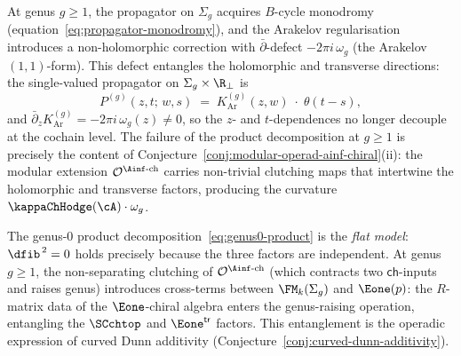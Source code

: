\begin{remark}
\label{rem:product-failure-higher-genus}
At genus $g \ge 1$, the propagator on $\Sigma_g$ acquires
$B$-cycle monodromy (equation~\eqref{eq:propagator-monodromy}),
and the Arakelov regularisation introduces a non-holomorphic
correction with $\bar\partial$-defect
$-2\pi i\, \omega_g$ (the Arakelov $(1,1)$-form).
This defect entangles the holomorphic and transverse directions:
the single-valued propagator on $\Sigma_g \times \R_{\perp}$ is
\[
 P^{(g)}(z,t;\, w,s)
 \;=\;
 K^{(g)}_{\mathrm{Ar}}(z,w) \;\cdot\; \theta(t-s),
\]
and $\bar\partial_z K^{(g)}_{\mathrm{Ar}} = -2\pi i\,\omega_g(z)
\ne 0$, so the $z$- and $t$-dependences no longer decouple at the
cochain level. The failure of the product decomposition at $g \ge 1$
is precisely the content of
Conjecture~\ref{conj:modular-operad-ainf-chiral}(ii): the modular
extension $\mathcal{O}^{\Ainf\text{-ch}}$ carries non-trivial
clutching maps that intertwine the holomorphic and transverse
factors, producing the curvature
$\kappaChHodge(\cA) \cdot \omega_g$.

The genus-$0$ product decomposition~\eqref{eq:genus0-product}
is the \emph{flat model}: $\dfib^{\,2} = 0$ holds precisely
because the three factors are independent.
At genus $g \ge 1$, the non-separating clutching of
$\mathcal{O}^{\Ainf\text{-ch}}$ (which contracts two
$\mathsf{ch}$-inputs and raises genus) introduces
cross-terms between $\FM_k(\Sigma_g)$ and $\Eone(p)$:
the $R$-matrix data of the $\Eone$-chiral algebra enters
the genus-raising operation, entangling the $\SCchtop$ and
$\Eone^{\mathsf{tr}}$ factors.
This entanglement is the operadic expression of curved Dunn
additivity (Conjecture~\ref{conj:curved-dunn-additivity}).
\end{remark}

